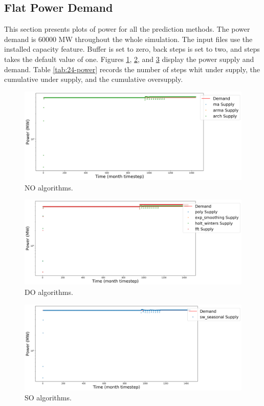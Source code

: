 \documentclass[11pt]{article}
\begin{document}
\subsection{Flat Power Demand}

This section presents plots of power for all the prediction methods. The power demand is 60000 MW throughout the whole simulation. The input files use the installed capacity feature. Buffer is set to zero, back steps is set to two, and steps takes the default value of one.
Figures \ref{fig:24-NO}, \ref{fig:24-DO}, and \ref{fig:24-SO} display the power supply and demand.
Table \ref{tab:24-power} records the number of steps whit under supply, the cumulative under supply, and the cumulative oversupply.

\begin{figure}[H]
	\centering
	\includegraphics[width=\textwidth]{24-figures/24-power-buffer01.png} 
	\hfill
	\caption{NO algorithms.}
	\label{fig:24-NO}
\end{figure}

\begin{figure}[H]
	\centering
	\includegraphics[width=\textwidth]{24-figures/24-power-buffer02.png} 
	\hfill
	\caption{DO algorithms.}
	\label{fig:24-DO}
\end{figure}

\begin{figure}[H]
	\centering
	\includegraphics[width=\textwidth]{24-figures/24-power-buffer03.png} 
	\hfill
	\caption{SO algorithms.}
	\label{fig:24-SO}
\end{figure}
\end{document}
